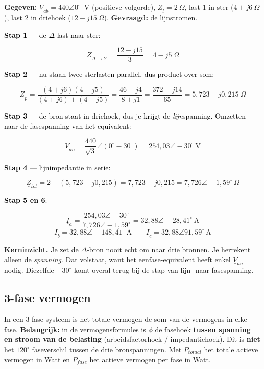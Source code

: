 \documentclass[a4paper,11pt]{article}
\newcommand{\stapreden}[1]{\par\vspace{1.4mm}\noindent\textcolor{black}{#1}\par\vspace{-2mm}}
\begin{document}
\begin{oefenblok}
    \textbf{Gegeven:} $\underline{V}_{ab} = 440\angle 0^\circ$~V (positieve volgorde),
    $\underline{Z}_l = 2\ \Omega$, last 1 in ster ($4 + j6\ \Omega$), last 2 in driehoek
    ($12 - j15\ \Omega$). \textbf{Gevraagd:} de lijnstromen.

    \stapreden{\textbf{Stap 1} --- de $\Delta$-last naar ster:}
    \[\underline{Z}_{\Delta \to Y} = \frac{12 - j15}{3} = 4 - j5\ \Omega\]

    \stapreden{\textbf{Stap 2} --- nu staan twee sterlasten parallel, dus product over som:}
    \[\underline{Z}_p = \frac{(4+j6)(4-j5)}{(4+j6)+(4-j5)} = \frac{46+j4}{8+j1}
        = \frac{372 - j14}{65} = 5{,}723 - j0{,}215\ \Omega\]

    \stapreden{\textbf{Stap 3} --- de bron staat in driehoek, dus je krijgt de \emph{lijn}spanning. Omzetten naar de fasespanning van het equivalent:}
    \[\underline{V}_{an} = \frac{440}{\sqrt{3}}\angle(0^\circ - 30^\circ) = 254{,}03\angle -30^\circ\ \text{V}\]

    \stapreden{\textbf{Stap 4} --- lijnimpedantie in serie:}
    \[\underline{Z}_{tot} = 2 + (5{,}723 - j0{,}215) = 7{,}723 - j0{,}215 = 7{,}726\angle -1{,}59^\circ\ \Omega\]

    \stapreden{\textbf{Stap 5 en 6}:}
    \[\underline{I}_a = \frac{254{,}03\angle -30^\circ}{7{,}726\angle -1{,}59^\circ}
        = \boxed{32{,}88\angle -28{,}41^\circ\ \text{A}}\]
    \[\underline{I}_b = \boxed{32{,}88\angle -148{,}41^\circ\ \text{A}}
        \qquad
        \underline{I}_c = \boxed{32{,}88\angle 91{,}59^\circ\ \text{A}}\]

    \textbf{Kerninzicht.} Je zet de $\Delta$-bron nooit echt om naar drie bronnen. Je herrekent alleen
    de \emph{spanning}. Dat volstaat, want het eenfase-equivalent heeft enkel $\underline{V}_{an}$
    nodig. Diezelfde $-30^\circ$ komt overal terug bij de stap van lijn- naar fasespanning.
\end{oefenblok}

\subsection{3-fase vermogen}

In een 3-fase systeem is het totale vermogen de som van de vermogens in elke fase.
\newline
\textbf{Belangrijk:} in de vermogensformules is $\phi$ de fasehoek \textbf{tussen spanning en stroom van de belasting} (arbeidsfactorhoek / impedantiehoek). Dit is \textbf{niet} het $120^\circ$ faseverschil tussen de drie bronspanningen.
{Met $P_{totaal}$ het totale actieve vermogen in Watt en $P_{fase}$ het actieve vermogen per fase in Watt.}
\end{document}
